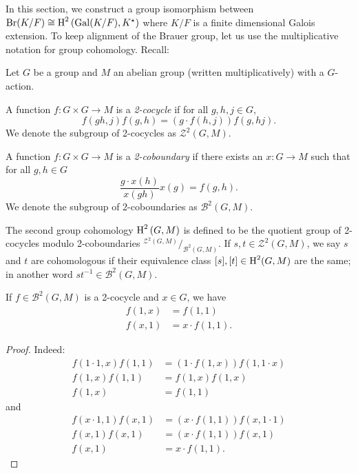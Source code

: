 In this section, we construct a group isomorphism between $\operatorname{Br}(K/F) \cong \operatorname{H}^{2}\left(\operatorname{Gal}(K/F), K^{\star}\right)$ where $K/F$ is a finite dimensional Galois extension. To keep alignment of the Brauer group, let us use the multiplicative notation for group cohomology. Recall:

\begin{definition}
  \label{def:second-group-coh}
  Let $G$ be a group and $M$ an abelian group (written multiplicatively) with a $G$-action.

  A function $f : G \times G \to M$ is a {\em 2-cocycle\/} if for all $g,h,j\in G$,
  \[
    f(gh, j)f(g, h) = \left(g\cdot f(h, j)\right) f(g, hj).
  \]
  We denote the subgroup of 2-cocycles as $\mathcal{Z}^{2}(G, M)$.

  A function $f : G\times G \to M$ is a {\em 2-coboundary\/} if there exists an $x : G \to M$ such that for all $g, h \in G$
  \[
    \frac{g\cdot x(h)}{x(gh)} x(g) = f(g, h).
  \]
  We denote the subgroup of 2-coboundaries as $\mathcal{B}^{2}(G, M)$.

  The second group cohomology $\operatorname{H}^{2}\left(G, M\right)$ is defined to be the quotient group of 2-cocycles modulo 2-coboundaries $^{\mathcal{Z}^{2}(G, M)}/_{\mathcal{B}^{2}(G, M)}$. If $s, t \in \mathcal{Z}^{2}(G, M)$, we say $s$ and $t$ are cohomologous if their equivalence class $[s], [t] \in \operatorname{H}^{2}(G, M)$ are the same; in another word $st^{-1}\in\mathcal{B}^{2}(G, M)$.
  \leanok
\end{definition}

\begin{lemma}\label{lem:2-cocycle-one-one}
  If $f \in \mathcal{B}^{2}(G, M)$ is a 2-cocycle and $x\in G$, we have
  \[
    \begin{aligned}
    f(1, x) &= f(1, 1) \\
    f(x, 1) &= x\cdot f(1, 1).
    \end{aligned}
  \]
\end{lemma}
\begin{proof}
  Indeed:
  \[
    \begin{aligned}
      f(1\cdot 1, x)f(1, 1) &= (1\cdot f(1,x))f(1, 1\cdot x)  \\
      f(1, x)f(1, 1) &= f(1, x) f(1,x) \\
      f(1, x) &= f(1,1)
    \end{aligned}
  \] and
  \[
    \begin{aligned}
      f(x\cdot 1, 1)f(x, 1) &= (x\cdot f(1, 1))f(x, 1\cdot 1)\\
      f(x, 1)f(x, 1) &= (x\cdot f(1, 1))f(x, 1)\\
      f(x, 1) &= x \cdot f(1, 1).
    \end{aligned}
  \]
  \leanok
\end{proof}

